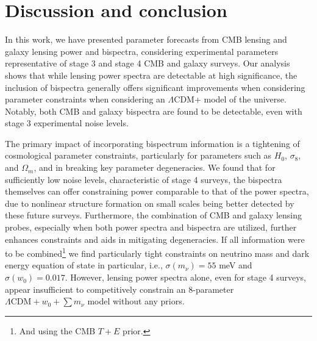 \documentclass[11pt]{article} %
\begin{document}
\pagebreak



\section{Discussion and conclusion}\label{sec:discussion}
In this work, we have presented parameter forecasts from CMB lensing and galaxy lensing power and bispectra, considering experimental parameters representative of stage 3 and stage 4 CMB and galaxy surveys. Our analysis shows that while lensing power spectra are detectable at high significance, the inclusion of bispectra generally offers significant improvements when considering parameter constraints when considering an $\Lambda$CDM+ model of the universe. Notably, both CMB and galaxy bispectra are found to be detectable, even with stage 3 experimental noise levels.

The primary impact of incorporating bispectrum information is a tightening of cosmological parameter constraints, particularly for parameters such as $H_0$, $\sigma_8$, and $\Omega_m$, and in breaking key parameter degeneracies. We found that for sufficiently low noise levels, characteristic of stage 4 surveys, the bispectra themselves can offer constraining power comparable to that of the power spectra, due to nonlinear structure formation on small scales being better detected by these future surveys. Furthermore, the combination of CMB and galaxy lensing probes, especially when both power spectra and bispectra are utilized, further enhances constraints and aids in mitigating degeneracies. If all information were to be combined\footnote{And using the CMB $T+E$ prior.} we find particularly tight constraints on neutrino mass and dark energy equation of state in particular, i.e., $\sigma(m_\nu) = 55$ meV and $\sigma(w_0) = 0.017$. However, lensing power spectra alone, even for stage 4 surveys, appear insufficient to competitively constrain an 8-parameter $\Lambda\text{CDM} + w_0 + \sum m_\nu$ model without any priors.
\end{document}
